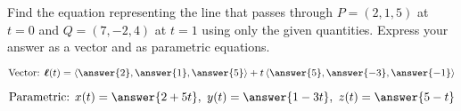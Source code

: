 \documentclass{ximera}
\author{Gregory Hartman \and Matthew Carr}
\begin{document}
\begin{exercise}



Find the equation representing the line that passes through $P=(2,1,5)$ at $t=0$ and $Q=(7,-2,4)$ at $t=1$ using only the given quantities. Express your answer as a vector and as parametric equations.

\begin{prompt}
\[
\text{Vector:  } \vecl(t)=\vector{\answer{2},\answer{1},\answer{5}}+t\vector{\answer{5},\answer{-3},\answer{-1}}
\]
\end{prompt}
\begin{prompt}
\[
\text{Parametric:  } x(t)=\answer{2+5t},\ y(t)=\answer{1-3t},\ z(t)=\answer{5-t}
\]
\end{prompt}


\end{exercise}
\end{document}
